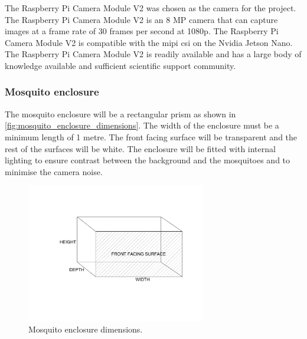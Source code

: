 The Raspberry Pi Camera Module V2 was chosen as the camera for the project. The Raspberry Pi Camera Module V2 is an 8 MP camera that can capture images at a frame rate of 30 frames per second at 1080p. The Raspberry Pi Camera Module V2 is compatible with the \gls{mipi} \gls{csi} on the Nvidia Jetson Nano. The Raspberry Pi Camera Module V2 is readily available and has a large body of knowledge available and sufficient scientific support community.



\subsubsection{Mosquito enclosure}
The mosquito enclosure will be a rectangular prism as shown in \autoref{fig:mosquito_enclosure_dimensions}. The width of the enclosure must be a minimum length of 1 metre. The front facing surface will be transparent and the rest of the surfaces will be white. The enclosure will be fitted with internal lighting to ensure contrast between the background and the mosquitoes and to minimise the camera noise.
\begin{figure}[h]
    \centering
    \includegraphics[width=0.7\textwidth]{figures/hardware_design/mos_enclosure.pdf}
    \caption{Mosquito enclosure dimensions.}
    \label{fig:mosquito_enclosure_dimensions}
\end{figure}



